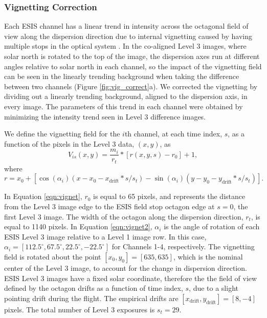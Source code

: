 \documentclass[linenumbers,trackchanges]{aastex63}
\begin{document}
\subsubsection{Vignetting Correction}
  
Each ESIS channel has a linear trend in intensity across the octagonal field of view along the dispersion direction due to internal vignetting caused by having multiple stops in the optical system \citep{ESIS}.
In the co-aligned Level 3 images, where solar north is rotated to the top of the image, the dispersion axes run at different angles relative to solar north in each channel, so the impact of the vignetting field can be seen in the linearly trending background when taking the difference between two channels (Figure \ref{fig:vig_correct}a).
We corrected the vignetting by dividing out a linearly trending background, aligned to the dispersion axis, in every image. The parameters of this trend in each channel were obtained by minimizing the intensity trend seen in Level 3 difference images.

We define the vignetting field for the $i$th channel, at each time index, $s$, as a function of the pixels in the Level 3 data, $(x,y)$, as 
	\begin{equation}
		V_{is}(x,y) = \frac{m_i}{r_t} * [r(x,y,s) - r_0] + 1,
		\label{eqn:vignet}
	\end{equation}
where
	\begin{equation}
		r = x_0 + [\cos(\alpha_i)(x-x_0-x_{\text{drift}}*s/s_t) - \sin(\alpha_i)(y-y_0-y_{\text{drift}}*s/s_t)].
		\label{eqn:vignet2}
	\end{equation}

In Equation \ref{eqn:vignet}, $r_0$ is equal to 65 pixels, and represents the distance from the Level 3 image edge to the ESIS field stop octagon edge at $s = 0$, the first Level 3 image.
The width of the octagon along the dispersion direction, $r_t$, is equal to 1140 pixels.
In Equation \ref{eqn:vignet2},  $\alpha_i$ is the angle of rotation of each ESIS Level 3 image relative to a Level 1 image row.
In this case, $\alpha_i = [112.5^{\circ}, 67.5^{\circ}, 22.5^{\circ}, -22.5^{\circ}]$ for Channels 1-4, respectively.
The vignetting field is rotated about the point $[x_0, y_0] = [635,635]$, which is the nominal center of the Level 3 image, to account for the change in dispersion direction.
ESIS Level 3 images have a fixed solar coordinate, therefore the the field of view defined by the octagon drifts as a function of time index, $s$, due to a slight pointing drift during the flight. 
The empirical drifts are $[x_{\text{drift}},y_{\text{drift}}] = [8, -4]$ pixels. 
The total number of Level 3 exposures is $s_t=29$. 
\end{document}
